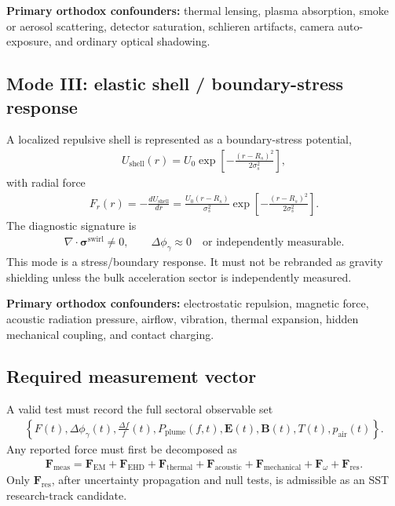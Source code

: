 \textbf{Primary orthodox confounders:}
thermal lensing, plasma absorption, smoke or aerosol scattering, detector
saturation, schlieren artifacts, camera auto-exposure, and ordinary optical
shadowing.

\subsection{Mode III: elastic shell / boundary-stress response}

A localized repulsive shell is represented as a boundary-stress potential,
\begin{align}
    U_{\mathrm{shell}}(r)
    =
    U_0
    \exp\left[
    -\frac{(r-R_s)^2}{2\sigma_s^2}
    \right],
    \label{eq:rt_shell_potential}
\end{align}
with radial force
\begin{align}
    F_r(r)
    =
    -\frac{dU_{\mathrm{shell}}}{dr}
    =
    \frac{U_0(r-R_s)}{\sigma_s^2}
    \exp\left[
    -\frac{(r-R_s)^2}{2\sigma_s^2}
    \right].
    \label{eq:rt_shell_force}
\end{align}
The diagnostic signature is
\begin{align}
    \nabla\cdot\boldsymbol{\sigma}^{\mathrm{swirl}}\neq0,
    \qquad
    \Delta\phi_\gamma\approx0
    \quad
    \text{or independently measurable}.
    \label{eq:rt_shell_signature}
\end{align}
This mode is a stress/boundary response. It must not be rebranded as gravity
shielding unless the bulk acceleration sector is independently measured.

\textbf{Primary orthodox confounders:}
electrostatic repulsion, magnetic force, acoustic radiation pressure, airflow,
vibration, thermal expansion, hidden mechanical coupling, and contact charging.

\subsection{Required measurement vector}

A valid test must record the full sectoral observable set
\begin{align}
    \boxed{
    \left\{
    F(t),
    \Delta\phi_\gamma(t),
    \frac{\Delta f}{f}(t),
    P_{\mathrm{plume}}(f,t),
    \mathbf{E}(t),
    \mathbf{B}(t),
    T(t),
    p_{\mathrm{air}}(t)
    \right\}.
    }
    \label{eq:rt_triadic_measurement_vector}
\end{align}
Any reported force must first be decomposed as
\begin{align}
    \mathbf{F}_{\mathrm{meas}}
    =
    \mathbf{F}_{\mathrm{EM}}
    +
    \mathbf{F}_{\mathrm{EHD}}
    +
    \mathbf{F}_{\mathrm{thermal}}
    +
    \mathbf{F}_{\mathrm{acoustic}}
    +
    \mathbf{F}_{\mathrm{mechanical}}
    +
    \mathbf{F}_{\omega}
    +
    \mathbf{F}_{\mathrm{res}}.
    \label{eq:rt_triadic_force_decomposition}
\end{align}
Only \(\mathbf{F}_{\mathrm{res}}\), after uncertainty propagation and null tests,
is admissible as an SST research-track candidate.

